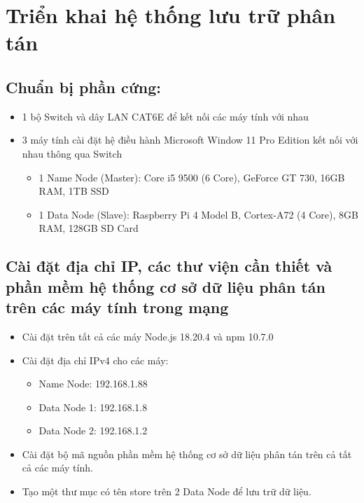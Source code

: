 \documentclass[../main.tex]{subfiles}
\begin{document}
\section{Triển khai hệ thống lưu trữ phân tán}
 
\subsection{Chuẩn bị phần cứng: }
\begin{itemize}
    \item 1 bộ Switch và dây LAN CAT6E để kết nối các máy tính với nhau
    \item 3 máy tính cài đặt hệ điều hành Microsoft Window 11 Pro Edition kết nối với nhau thông qua Switch
    \begin{itemize}
        \item 1 Name Node (Master): Core i5 9500 (6 Core), GeForce GT 730, 16GB RAM, 1TB SSD
        \item 1 Data Node (Slave): Raspberry Pi 4 Model B, Cortex-A72 (4 Core), 8GB RAM, 128GB SD Card 
    \end{itemize}
\end{itemize}
\subsection{Cài đặt địa chỉ IP, các thư viện cần thiết và phần mềm hệ thống cơ sở dữ liệu phân tán trên các máy tính trong mạng}
\begin{itemize}
    \item Cài đặt trên tất cả các máy Node.js 18.20.4 và npm 10.7.0
    \item Cài đặt địa chỉ IPv4 cho các máy:
    \begin{itemize}
        \item Name Node: 192.168.1.88
        \item Data Node 1: 192.168.1.8
        \item Data Node 2: 192.168.1.2
    \end{itemize}
    \item Cài đặt bộ mã nguồn phần mềm hệ thống cơ sở dữ liệu phân tán trên cả tất cả các máy tính.
    \item Tạo một thư mục có tên store trên 2 Data Node để lưu trữ dữ liệu.   
\end{itemize}
\end{document}
